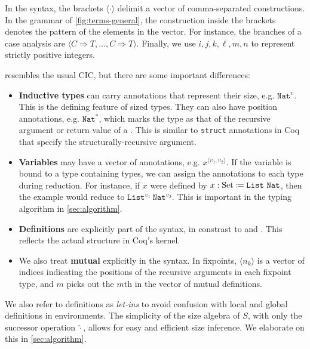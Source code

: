\documentclass[acmsmall,nonacm,screen,review,anonymous,10pt]{acmart}
\begin{document}
In the syntax, the brackets $\langle \cdot \rangle$ delimit a vector of comma-separated constructions. In the grammar of \autoref{fig:terms-general}, the construction inside the brackets denotes the pattern of the elements in the vector. For instance, the branches of a case analysis are $\langle C \Rightarrow T, \dots, C \Rightarrow T \rangle$. Finally, we use $i, j, k, \ell, m, n$ to represent strictly positive integers.

\lang resembles the usual CIC, but there are some important differences:

\begin{itemize}
    \item \textbf{Inductive types} can carry annotations that represent their size, e.g. $\texttt{Nat}^\upsilon$. This is the defining feature of sized types. They can also have position annotations, e.g. $\texttt{Nat}^*$, which marks the type as that of the recursive argument or return value of a \cofixpoint. This is similar to \texttt{struct} annotations in Coq that specify the structurally-recursive argument.
    \item \textbf{Variables} may have a vector of annotations, e.g. $x^{\langle \upsilon_1, \upsilon_2 \rangle}$. If the variable is bound to a type containing \coinductive types, we can assign the annotations to each \coinductive type during reduction. For instance, if $x$ were defined by $x : \text{Set} \coloneqq \texttt{List}\ \texttt{Nat}$, then the example would reduce to $\texttt{List}^{\upsilon_1}\ \texttt{Nat}^{\upsilon_2}$. This is important in the typing algorithm in \autoref{sec:algorithm}.
    \item \textbf{Definitions} are explicitly part of the syntax, in constrast to \CIChat and \CIChatbar \cite{cic-hat-bar}. This reflects the actual structure in Coq's kernel.
    \item We also treat \textbf{mutual \cofixpoints} explicitly in the syntax. In fixpoints, $\langle n_k \rangle$ is a vector of indices indicating the positions of the recursive arguments in each fixpoint type, and $m$ picks out the $m$th \cofixpoint in the vector of mutual definitions.
\end{itemize}

We also refer to definitions as \textit{let-ins} to avoid confusion with local and global definitions in environments. The simplicity of the size algebra of $S$, with only the successor operation $\widehat{\cdot}$, allows for easy and efficient size inference. We elaborate on this in \autoref{sec:algorithm}.
\end{document}
